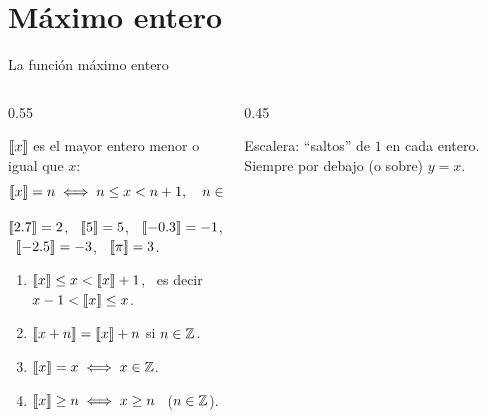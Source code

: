 \documentclass[10pt,aspectratio=169]{beamer}
\begin{document}
\section{Máximo entero}

\begin{frame}{La función máximo entero}
  \begin{columns}
    \begin{column}{0.55\textwidth}
      \begin{definicion}
        $\left\llbracket x\right\rrbracket$ es el mayor entero menor o igual que $x$:
        \[ \left\llbracket x\right\rrbracket=n\iff n\le x<n+1,\quad n\in\mathbb{Z}. \]
      \end{definicion}
      \begin{ejemplo}
        $\left\llbracket 2.7\right\rrbracket=2$, \ $\left\llbracket 5\right\rrbracket=5$, \ $\left\llbracket -0.3\right\rrbracket=-1$, \ $\left\llbracket -2.5\right\rrbracket=-3$, \ $\left\llbracket \pi\right\rrbracket=3$.
      \end{ejemplo}
      \begin{proposicion}
        \begin{enumerate}
          \item $\left\llbracket x\right\rrbracket\le x<\left\llbracket x\right\rrbracket+1$, \ es decir \ $x-1<\left\llbracket x\right\rrbracket\le x$.
          \item $\left\llbracket x+n\right\rrbracket=\left\llbracket x\right\rrbracket+n$ si $n\in\mathbb{Z}$.
          \item $\left\llbracket x\right\rrbracket=x\iff x\in\mathbb{Z}$.
          \item $\left\llbracket x\right\rrbracket\ge n\iff x\ge n$ \ ($n\in\mathbb{Z}$).
        \end{enumerate}
      \end{proposicion}
    \end{column}
    \begin{column}{0.45\textwidth}
      \centering

      \small Escalera: ``saltos'' de $1$ en cada entero. Siempre por debajo (o sobre) $y=x$.
    \end{column}
  \end{columns}
\end{frame}
\end{document}
